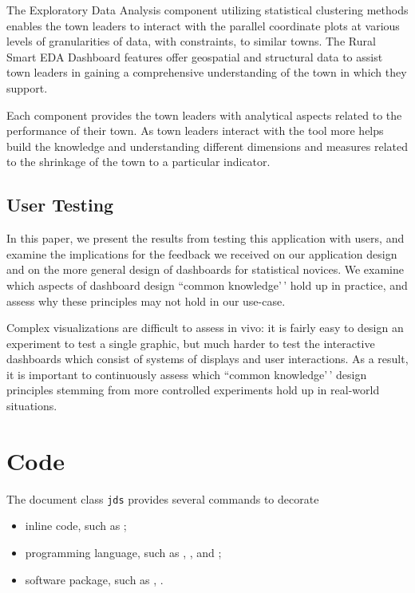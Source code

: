 \documentclass[letterpaper,inpress]{jdsart}
\begin{document}
The Exploratory Data Analysis component utilizing statistical clustering methods enables the town leaders to interact with the parallel coordinate plots at various levels of granularities of data, with constraints, to similar towns. The Rural Smart EDA Dashboard features offer geospatial and structural data to assist town leaders in gaining a comprehensive understanding of the town in which they support.

Each component provides the town leaders with analytical aspects related to the performance of their town. As town leaders interact with the tool more helps build the knowledge and understanding different dimensions and measures related to the shrinkage of the town to a particular indicator.

\subsection{User Testing}

In this paper, we present the results from testing this application with users, and examine the implications for the feedback we received on our application design and on the more general design of dashboards for statistical novices. We examine which aspects of dashboard design ``common knowledge'\,' hold up in practice, and assess why these principles may not hold in our use-case.

Complex visualizations are difficult to assess in vivo: it is fairly easy to design an experiment to test a single graphic, but much harder to test the interactive dashboards which consist of systems of displays and user interactions. As a result, it is important to continuously assess which ``common knowledge'\,' design principles stemming from more controlled experiments hold up in real-world situations.

\hypertarget{code}{%
\section{Code}\label{code}}

The document class \texttt{jds} provides several commands to decorate

\begin{itemize}
\item inline code, such as ;
\item programming language, such as , , and
  ;
\item software package, such as , .
\end{itemize}
\end{document}

